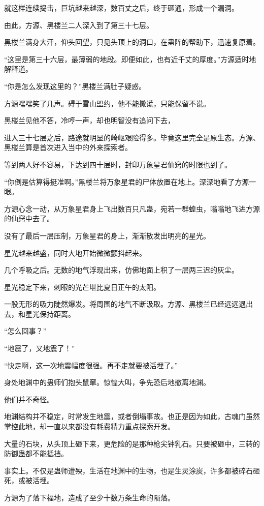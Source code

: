 \begin{this_body}
就这样连续捣击，巨坑越来越深，数百丈之后，终于砸通，形成一个漏洞。

由此，方源、黑楼兰二人深入到了第三十七层。

黑楼兰满身大汗，仰头回望，只见头顶上的洞口，在蛊阵的帮助下，迅速复原着。

“这里是第三十六层，最薄弱的地段。即便如此，也有近千丈的厚度。”方源适时地解释道。

“你是怎么发现这里的？”黑楼兰满肚子疑惑。

方源嘿嘿笑了几声。碍于雪山盟约，他不能撒谎，只能保留不说。

黑楼兰见他不答，冷哼一声，却也明智没有追问下去，

进入三十七层之后，路途就明显的崎岖艰险得多。毕竟这里完全是原生态。方源、黑楼兰算是首次进入当中的外来探索者。

等到两人好不容易，下达到四十层时，封印万象星君仙窍的时限也到了。

“你倒是估算得挺准啊。”黑楼兰将万象星君的尸体放置在地上。深深地看了方源一眼。

方源心念一动，从万象星君身上飞出数百只凡蛊，宛若一群蝗虫，嗡嗡地飞进方源的仙窍中去了。

没有了最后一层压制，万象星君的身上，渐渐散发出明亮的星光。

星光越来越盛，同时大地开始微微颤抖起来。

几个呼吸之后。无数的地气浮现出来，仿佛地面上积了一层两三迟的灰尘。

星光稳定下来，刺眼的光芒堪比夏日正午的太阳。

一股无形的吸力陡然爆发。将周围的地气不断汲取。方源、黑楼兰已经远远退出去，和星光保持距离。

“怎么回事？”

“地震了，又地震了！”

“快走啊，这一次地震幅度很强。再不走就要被活埋了。”

身处地渊中的蛊师们抱头鼠窜。惊惶大叫，争先恐后地撤离地渊。

他们并不奇怪。

地渊结构并不稳定，时常发生地震，或者倒塌事故。也正是因为如此，古魂门虽然掌控此地，却一直以来都没有耗费精力重点探索开发。

大量的石块，从头顶上砸下来，更危险的是那种枪尖钟乳石。只要被砸中，三转的防御蛊都不能抵挡。

事实上。不仅是蛊师遭殃，生活在地渊中的生物，也是生灵涂炭，许多都被碎石砸死，或被活埋。

方源为了落下福地，造成了至少十数万条生命的陨落。


\end{this_body}
